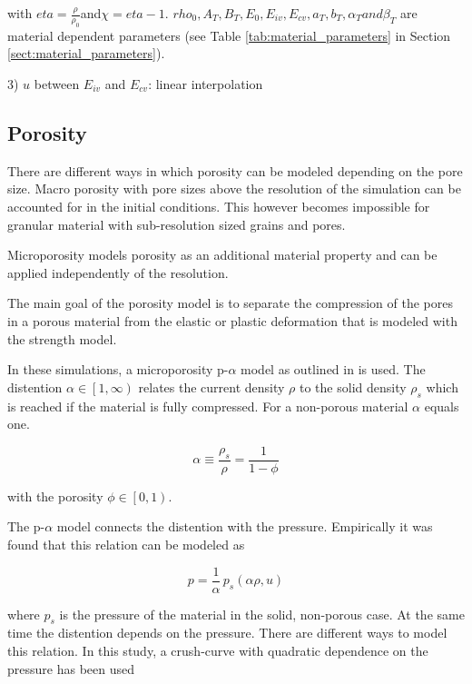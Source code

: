 with $eta = \frac{\rho}{\rho_0} $and$\chi = eta - 1$. $rho_0, A_T, B_T, E_0, E_{iv}, E_{cv}, a_T, b_T, \alpha_T and \beta_T$ are material dependent parameters (see Table \ref{tab:material_parameters} in Section \ref{sect:material_parameters}).

3) $u$ between $E_{iv}$ and $E_{cv}$: linear interpolation


\subsection{Porosity}
There are different ways in which porosity can be modeled depending on the pore size. Macro porosity with pore sizes above the resolution of the simulation can be accounted for in the initial conditions. This however becomes impossible for granular material with sub-resolution sized grains and pores.

Microporosity models porosity as an additional material property and can be applied independently of the resolution.

The main goal of the porosity model is to separate the compression of the pores in a porous material from the elastic or plastic deformation that is modeled with the strength model.

In these simulations, a microporosity p-$\alpha$ model as outlined in \cite{Jutzi_2008} is used. The distention $\alpha \in \left[1,\infty\right)$ relates the current density $\rho$ to the solid density $\rho_s$ which is reached if the material is fully compressed. For a non-porous material $\alpha$ equals one.

\begin{equation}
    \alpha \equiv \frac{\rho_s}{\rho} = \frac{1}{1 - \phi}
\end{equation}

with the porosity $\phi \in \left[0, 1\right)$.

The p-$\alpha$ model connects the distention with the pressure. Empirically it was found \cite{Carroll_1972} that this relation can be modeled as

\begin{equation}
    p = \frac{1}{\alpha}\,p_s(\alpha\rho, u)
\end{equation}

where $p_s$ is the pressure of the material in the solid, non-porous case. At the same time the distention depends on the pressure. There are different ways to model this relation. In this study, a crush-curve with quadratic dependence on the pressure has been used

